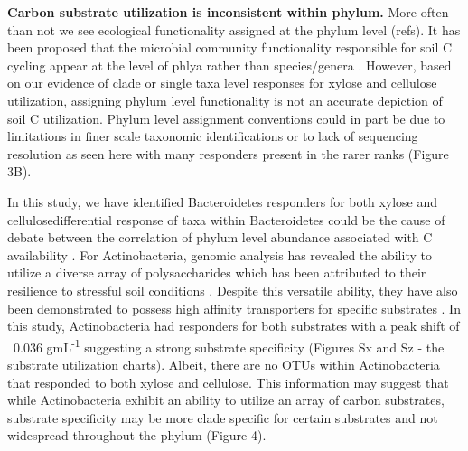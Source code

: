\textbf{Carbon substrate utilization is inconsistent within phylum.} More often than not we see ecological functionality assigned at the phylum level (refs). It has been proposed that the microbial community functionality responsible for soil C cycling appear at the level of phlya rather than species/genera \cite{Schimel_2012}. However, based on our evidence of clade or single taxa level responses for xylose and cellulose utilization, assigning phylum level functionality is not an accurate depiction of soil C utilization. Phylum level assignment conventions could in part be due to limitations in finer scale taxonomic identifications or to lack of sequencing resolution as seen here with many responders present in the rarer ranks (Figure 3B). 

In this study, we have identified Bacteroidetes responders for both xylose and cellulosedifferential response of taxa within Bacteroidetes could be the cause of debate between the correlation of phylum level abundance associated with C availability \cite{Fierer_2007,Rui_2009,Sharp_2000,L_pez_Lozano_2013,Bastian_2009}. For Actinobacteria, genomic analysis has revealed the ability to utilize a diverse array of polysaccharides which has been attributed to their resilience to stressful soil conditions \cite{Trivedi_2013}. Despite this versatile ability, they have also been demonstrated to possess high affinity transporters for specific substrates \cite{Trivedi_2013}. In this study, Actinobacteria had responders for both substrates with a peak shift of ~0.036 gmL\textsuperscript{-1} suggesting a strong substrate specificity (Figures Sx and Sz - the substrate utilization charts). Albeit, there are no OTUs within Actinobacteria that responded to both xylose and cellulose. This information may suggest that while Actinobacteria exhibit an ability to utilize an array of carbon substrates, substrate specificity may be more clade specific for certain substrates and not widespread throughout the phylum (Figure 4).

